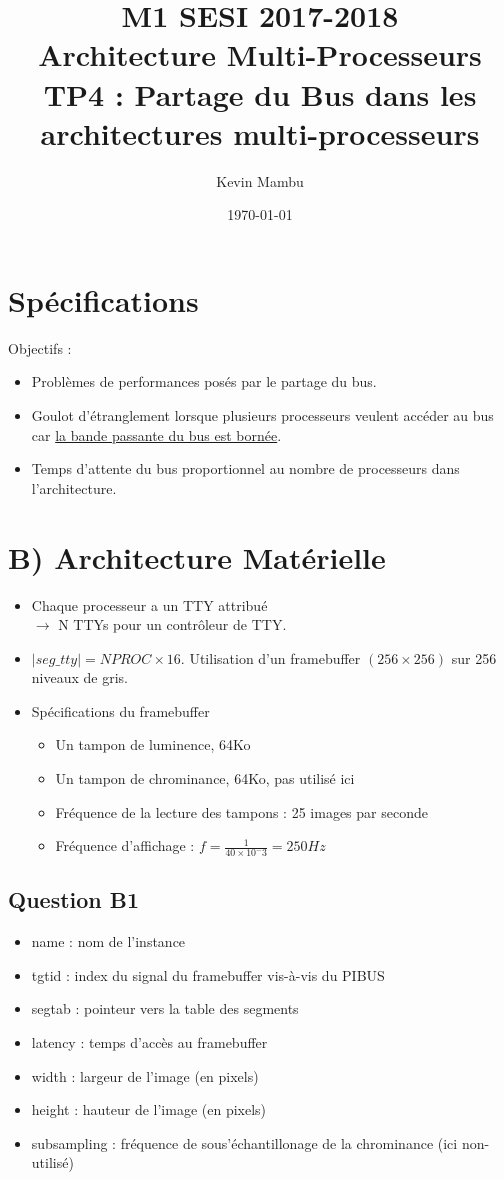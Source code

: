 \documentclass[10pt]{article}
\author{Kevin Mambu}
\date{\today}
\title{M1 SESI 2017-2018\\Architecture Multi-Processeurs\\TP4 : Partage du Bus
dans les architectures multi-processeurs}
\begin{document}
\maketitle
\section{Spécifications}
Objectifs :
\begin{itemize}
  \item Problèmes de performances posés par le partage du bus.
  \item Goulot d'étranglement lorsque plusieurs processeurs veulent accéder au
  bus car \underline{la bande passante du bus est bornée}.
  \item Temps d'attente du bus proportionnel au nombre de processeurs dans
  l'architecture.
\end{itemize}

\section{B) Architecture Matérielle}
\begin{itemize}
  \item Chaque processeur a un TTY attribué\\
  $\rightarrow$ N TTYs pour un contrôleur de TTY.
  \item $|seg\_tty| = {NPROC}\times{16}$.
  Utilisation d'un framebuffer $({256}\times{256})$ sur 256 niveaux de gris.
  \item Spécifications du framebuffer
  \begin{itemize}
    \item Un tampon de luminence, 64Ko
    \item Un tampon de chrominance, 64Ko, pas utilisé ici
    \item Fréquence de la lecture des tampons : 25 images par seconde
    \item Fréquence d'affichage : $f=\frac{1}{{40}\times{10^-3}}={250}Hz$
  \end{itemize}
\end{itemize}

\subsection{Question B1}
\begin{itemize}
  \item name : nom de l'instance
  \item tgtid : index du signal du framebuffer vis-à-vis du PIBUS
  \item segtab : pointeur vers la table des segments
  \item latency : temps d'accès au framebuffer
  \item width : largeur de l'image (en pixels)
  \item height : hauteur de l'image (en pixels)
  \item subsampling : fréquence de sous'échantillonage de la chrominance
  (ici non-utilisé)
\end{itemize}
\end{document}
